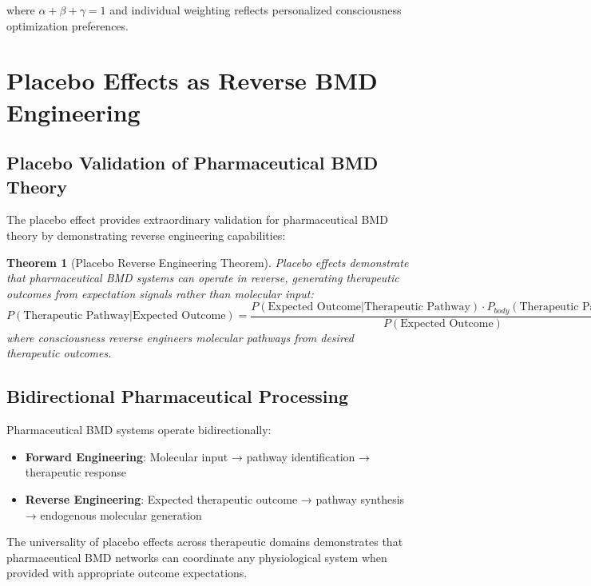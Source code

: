 \documentclass[12pt,a4paper]{article}
\newtheorem{theorem}{Theorem}
\begin{document}
where $\alpha + \beta + \gamma = 1$ and individual weighting reflects personalized consciousness optimization preferences.

\section{Placebo Effects as Reverse BMD Engineering}

\subsection{Placebo Validation of Pharmaceutical BMD Theory}

The placebo effect provides extraordinary validation for pharmaceutical BMD theory by demonstrating reverse engineering capabilities:

\begin{theorem}[Placebo Reverse Engineering Theorem]
Placebo effects demonstrate that pharmaceutical BMD systems can operate in reverse, generating therapeutic outcomes from expectation signals rather than molecular input:
\begin{equation}
P(\text{Therapeutic Pathway}|\text{Expected Outcome}) = \frac{P(\text{Expected Outcome}|\text{Therapeutic Pathway}) \cdot P_{body}(\text{Therapeutic Pathway})}{P(\text{Expected Outcome})}
\end{equation}
where consciousness reverse engineers molecular pathways from desired therapeutic outcomes.
\end{theorem}

\subsection{Bidirectional Pharmaceutical Processing}

Pharmaceutical BMD systems operate bidirectionally:

\begin{itemize}
\item \textbf{Forward Engineering}: Molecular input → pathway identification → therapeutic response
\item \textbf{Reverse Engineering}: Expected therapeutic outcome → pathway synthesis → endogenous molecular generation
\end{itemize}

The universality of placebo effects across therapeutic domains demonstrates that pharmaceutical BMD networks can coordinate any physiological system when provided with appropriate outcome expectations.
\end{document}
